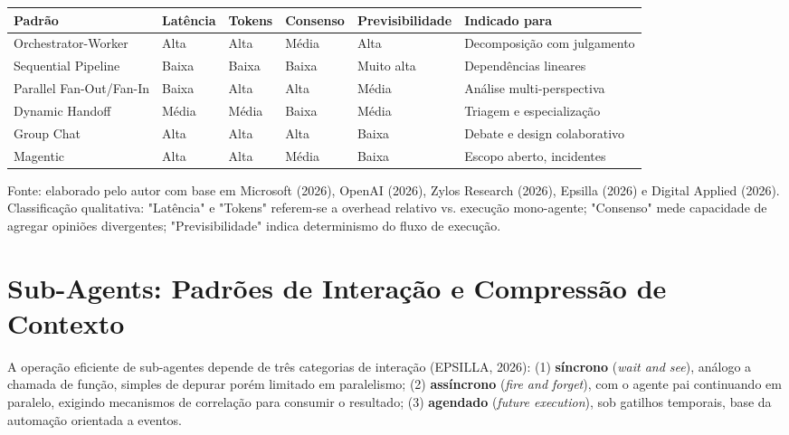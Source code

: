 \documentclass[12pt,a4paper]{article}
\begin{document}
\begin{center}
{\footnotesize
\setlength{\tabcolsep}{4pt}
\begin{tabularx}{\linewidth}{>{\raggedright\arraybackslash}X>{\centering\arraybackslash}X>{\centering\arraybackslash}X>{\centering\arraybackslash}X>{\centering\arraybackslash}X>{\raggedright\arraybackslash}X}
\toprule
\textbf{Padrão} & \textbf{Latência} & \textbf{Tokens} & \textbf{Consenso} & \textbf{Previsibilidade} & \textbf{Indicado para} \\
\midrule
Orchestrator-Worker & Alta & Alta & Média & Alta & Decomposição com julgamento \\
Sequential Pipeline & Baixa & Baixa & Baixa & Muito alta & Dependências lineares \\
Parallel Fan-Out/Fan-In & Baixa & Alta & Alta & Média & Análise multi-perspectiva \\
Dynamic Handoff & Média & Média & Baixa & Média & Triagem e especialização \\
Group Chat & Alta & Alta & Alta & Baixa & Debate e design colaborativo \\
Magentic & Alta & Alta & Média & Baixa & Escopo aberto, incidentes \\
\bottomrule
\end{tabularx}
}
\end{center}

Fonte: elaborado pelo autor com base em Microsoft (2026), OpenAI (2026), Zylos Research (2026), Epsilla (2026) e Digital Applied (2026). Classificação qualitativa: "Latência" e "Tokens" referem-se a overhead relativo vs. execução mono-agente; "Consenso" mede capacidade de agregar opiniões divergentes; "Previsibilidade" indica determinismo do fluxo de execução.


\section{Sub-Agents: Padrões de Interação e Compressão de Contexto}

A operação eficiente de sub-agentes depende de três categorias de interação (EPSILLA, 2026): (1) \textbf{síncrono} (\textit{wait and see}), análogo a chamada de função, simples de depurar porém limitado em paralelismo; (2) \textbf{assíncrono} (\textit{fire and forget}), com o agente pai continuando em paralelo, exigindo mecanismos de correlação para consumir o resultado; (3) \textbf{agendado} (\textit{future execution}), sob gatilhos temporais, base da automação orientada a eventos.
\end{document}
